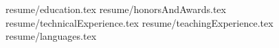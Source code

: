 \documentclass[11pt, a4paper]{MostafaGhadimiCV}
\newcommand*{\sectiondir}{resume/}
\begin{document}
\makecvheader
{resume/education.tex}
{resume/honorsAndAwards.tex}
{resume/technicalExperience.tex}
{resume/teachingExperience.tex}
{resume/languages.tex}
\end{document}
